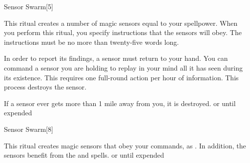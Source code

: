 \begin{spellsection}{Sensor Swarm}[5]
    \begin{spellheader}
    \end{spellheader}
    \begin{spellcontent}
        \begin{spelltargetinginfo}
        \end{spelltargetinginfo}
        \begin{spelleffects}

            \spellline
            \spelleffect This ritual creates a number of magic sensors equal to your spellpower. When you perform this ritual, you specify instructions that the sensors will obey. The instructions must be no more than twenty-five words long.

            \par In order to report its findings, a sensor must return to your hand. You can command a sensor you are holding to replay in your mind all it has seen during its existence. This requires one full-round action per hour of information. This process destroys the sensor.

            \par If a sensor ever gets more than 1 mile away from you, it is destroyed.
            \spelldur \durext or until expended \dismissable
        \end{spelleffects}
    \end{spellcontent}
    \begin{spellfooter}
        \spellnotes {}
    \end{spellfooter}
\end{spellsection}

\begin{spellsection}[Greater]{Sensor Swarm}[8]
    \begin{spellheader}
    \end{spellheader}
    \begin{spellcontent}
        \begin{spelltargetinginfo}
        \end{spelltargetinginfo}
        \begin{spelleffects}

            \spellline
            \spelleffect This ritual creates magic sensors that obey your commands, as . In addition, the sensors benefit from the  and  spells.
            \spelldur \durext or until expended \dismissable
        \end{spelleffects}
    \end{spellcontent}
    \begin{spellfooter}
    \end{spellfooter}
\end{spellsection}

